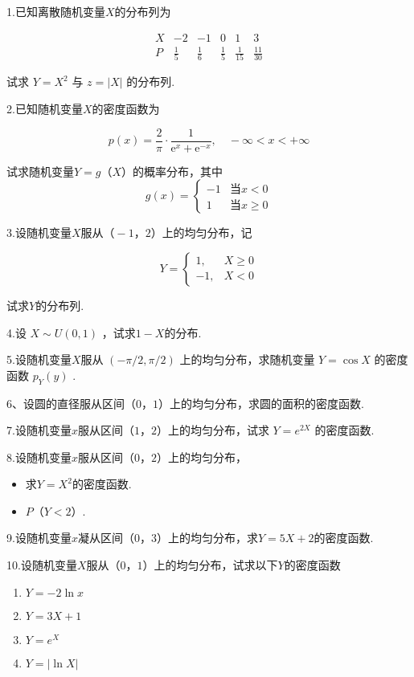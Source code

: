 1.已知离散随机变量$ X $的分布列为

\[
\begin{array}{c|ccccc}
X & {-2} & {-1} & {0} & {1} & {3} \\ \hline 
P & {\frac{1}{5}} & {\frac{1}{6}} & {\frac{1}{5}} & {\frac{1}{15}} & {\frac{11}{30}}
\end{array}
\]

试求 $Y=X^{2}$ 与 $z=|X|$ 的分布列.

2.已知随机变量$ X $的密度函数为

\[
p(x)=\frac{2}{\pi} \cdot \frac{1}{\mathrm{e}^{x}+\mathrm{e}^{-x}}, \quad-\infty<x<+\infty
\]

试求随机变量$ Y=g（X） $的概率分布，其中
\[
g(x)=\left\{
\begin{array}{ll}
{-1} & {\text{当} x<0}\\ 
{1} & {\text{当} x \geqslant 0}
\end{array}\right.
\]

3.设随机变量$ X $服从$ （-1，2） $上的均匀分布，记

\[
Y=\left\{\begin{array}{ll}{1,} & {X \geqslant 0} \\ {-1,} & {X<0}\end{array}\right.
\]

试求$ Y $的分布列.

4.设 $X \sim U(0,1)$ ，试求$ 1-X $的分布.

5.设随机变量$ X $服从 $(-\pi / 2, \pi / 2)$ 上的均匀分布，求随机变量 $Y=\cos X$ 的密度函数 $p_{Y}(y)$ .

6、设圆的直径服从区间$ （0，1） $上的均匀分布，求圆的面积的密度函数.

7.设随机变量$ x $服从区间$ （1，2） $上的均匀分布，试求 $Y=e^{2 X}$ 的密度函数.

8.设随机变量$ x $服从区间$ （0，2） $上的均匀分布，

\begin{itemize}
	\item 求$ Y=X^{2} $的密度函数.
	\item $ P（Y<2） $.
\end{itemize}

9.设随机变量$ x $凝从区间$ （0，3） $上的均匀分布，求$ Y=5X+2 $的密度函数.

10.设随机变量$ X $服从$ （0，1） $上的均匀分布，试求以下$ Y $的密度函数

\begin{enumerate}
	\item $ Y=-2\ln x $
	\item $ Y=3X+1 $
	\item $ Y=e^{X} $
	\item $ Y=|\ln X| $
\end{enumerate}

